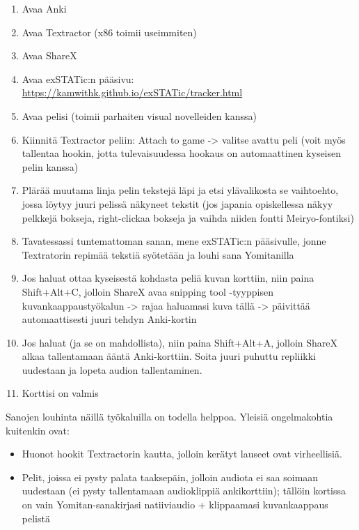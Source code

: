 \documentclass[
]{book}
\begin{document}
\begin{enumerate}
\def\labelenumi{\arabic{enumi}.}
\setcounter{enumi}{-1}
\item
  Avaa Anki
\item
  Avaa Textractor (x86 toimii useimmiten)
\item
  Avaa ShareX
\item
  Avaa exSTATic:n pääsivu: \url{https://kamwithk.github.io/exSTATic/tracker.html}
\item
  Avaa pelisi (toimii parhaiten visual novelleiden kanssa)
\item
  Kiinnitä Textractor peliin: Attach to game -\textgreater{} valitse avattu peli (voit myös tallentaa hookin, jotta tulevaisuudessa hookaus on automaattinen kyseisen pelin kanssa)
\item
  Plärää muutama linja pelin tekstejä läpi ja etsi ylävalikosta se vaihtoehto, jossa löytyy juuri pelissä näkyneet tekstit (jos japania opiskellessa näkyy pelkkejä bokseja, right-clickaa bokseja ja vaihda niiden fontti Meiryo-fontiksi)
\item
  Tavatessassi tuntemattoman sanan, mene exSTATic:n pääsivulle, jonne Textratorin repimää tekstiä syötetään ja louhi sana Yomitanilla
\item
  Jos haluat ottaa kyseisestä kohdasta peliä kuvan korttiin, niin paina Shift+Alt+C, jolloin ShareX avaa snipping tool -tyyppisen kuvankaappaustyökalun -\textgreater{} rajaa haluamasi kuva tällä -\textgreater{} päivittää automaattisesti juuri tehdyn Anki-kortin
\item
  Jos haluat (ja se on mahdollista), niin paina Shift+Alt+A, jolloin ShareX alkaa tallentamaan ääntä Anki-korttiin. Soita juuri puhuttu repliikki uudestaan ja lopeta audion tallentaminen.
\item
  Korttisi on valmis
\end{enumerate}

Sanojen louhinta näillä työkaluilla on todella helppoa. Yleisiä ongelmakohtia kuitenkin ovat:

\begin{itemize}
\item
  Huonot hookit Textractorin kautta, jolloin kerätyt lauseet ovat virheellisiä.
\item
  Pelit, joissa ei pysty palata taaksepäin, jolloin audiota ei saa soimaan uudestaan (ei pysty tallentamaan audioklippiä ankikorttiin); tällöin kortissa on vain Yomitan-sanakirjasi natiiviaudio + klippaamasi kuvankaappaus pelistä
\end{itemize}
\end{document}
